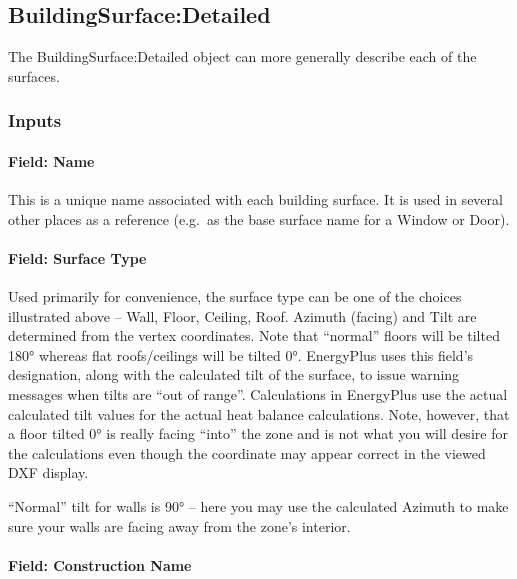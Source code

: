 \subsection{BuildingSurface:Detailed}\label{buildingsurfacedetailed}

The BuildingSurface:Detailed object can more generally describe each of the surfaces.

\subsubsection{Inputs}\label{inputs-23-006}

\paragraph{Field: Name}\label{field-name-19-005}

This is a unique name associated with each building surface. It is used in several other places as a reference (e.g.~as the base surface name for a Window or Door).

\paragraph{Field: Surface Type}\label{field-surface-type-000}

Used primarily for convenience, the surface type can be one of the choices illustrated above -- Wall, Floor, Ceiling, Roof. Azimuth (facing) and Tilt are determined from the vertex coordinates. Note that ``normal'' floors will be tilted 180° whereas flat roofs/ceilings will be tilted 0°. EnergyPlus uses this field's designation, along with the calculated tilt of the surface, to issue warning messages when tilts are ``out of range''. Calculations in EnergyPlus use the actual calculated tilt values for the actual heat balance calculations. Note, however, that a floor tilted 0° is really facing ``into'' the zone and is not what you will desire for the calculations even though the coordinate may appear correct in the viewed DXF display.

``Normal'' tilt for walls is 90° -- here you may use the calculated Azimuth to make sure your walls are facing away from the zone's interior.

\paragraph{Field: Construction Name}\label{field-construction-name-19}

